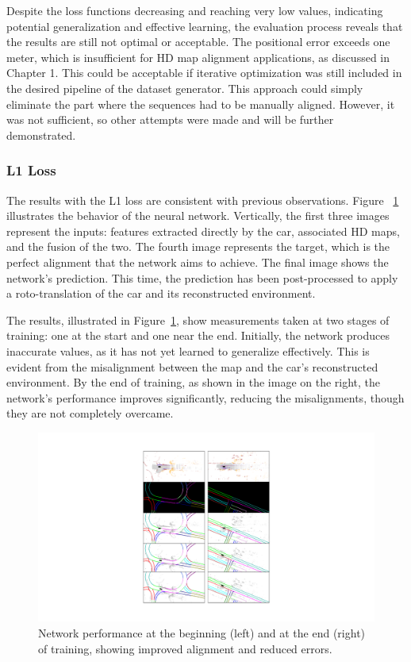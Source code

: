 Despite the loss functions decreasing and reaching very low values, indicating potential generalization and effective learning, the evaluation process reveals that the results are still not optimal or acceptable. The positional error exceeds one meter, which is insufficient for HD map alignment applications, as discussed in Chapter 1. This could be acceptable if iterative optimization was still included in the desired pipeline of the dataset generator. This approach could simply eliminate the part where the sequences had to be manually aligned. However, it was not sufficient, so other attempts were made and will be further demonstrated. 

\subsubsection*{L1 Loss}
The results with the L1 loss are consistent with previous observations. 
Figure ~\ref{fig:network-training-results1} illustrates the behavior of the neural network. Vertically, the first three images represent the inputs: features extracted directly by the car, associated HD maps, and the fusion of the two. The fourth image represents the target, which is the perfect alignment that the network aims to achieve. The final image shows the network's prediction. This time, the prediction has been post-processed to apply a roto-translation of the car and its reconstructed environment.

The results, illustrated in Figure~\ref{fig:network-training-results1}, show measurements taken at two stages of training: one at the start and one near the end. Initially, the network produces inaccurate values, as it has not yet learned to generalize effectively. This is evident from the misalignment between the map and the car's reconstructed environment. By the end of training, as shown in the image on the right, the network's performance improves significantly, reducing the misalignments, though they are not completely overcame.
\begin{figure}[H]
    \centering
    \includegraphics[width=1\linewidth]{LateX//figs/IMMAGINI_L1_rete.pdf}
    \caption{Network performance at the beginning (left) and at the end (right) of training, showing improved alignment and reduced errors.}
    \label{fig:network-training-results1}
\end{figure}

